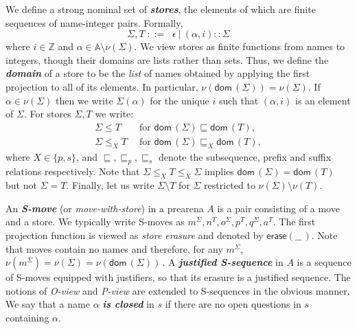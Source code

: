 \documentclass{CSML}
\theoremstyle{definition}\newtheorem{definition}[thm]{Definition}
\theoremstyle{definition}\newtheorem{example}[thm]{Example}
\theoremstyle{definition}\newtheorem{proposition}[thm]{Proposition}
\theoremstyle{definition}\newtheorem{lemma}[thm]{Lemma}
\theoremstyle{definition}\newtheorem{theorem}[thm]{Theorem}
\theoremstyle{definition}\newtheorem{corollary}[thm]{Corollary}
\theoremstyle{definition}\newtheorem{remark}[thm]{Remark}
\renewcommand\Sigma{\varSigma}
\newcommand\Tau{T}
\newcommand\Erase[1]{\mathsf{erase}(#1)}
\newcommand\remv{\setminus}
\newcommand\boldemph[1]{\emph{\textbf{#1}}}
\newcommand\A{\mathbb{A}}
\newcommand\Z{\mathbb{Z}}
\newcommand\dom[1]{\mathsf{dom}\,#1}
\newcommand\substore\leq
\newcommand\prefix{\sqsubseteq_p}
\newcommand\suffix{\sqsubseteq_s}
\newcommand\subseq\sqsubseteq
\newcommand\na\alpha
\begin{document}
We define a strong nominal set of \boldemph{stores}, the elements of which are finite sequences of
name-integer pairs. Formally,
\[ 
\Sigma,\Tau\; ::=\;\; \epsilon\ |\ (\na,i)::\Sigma 
\]
where $i\in\Z$ and $\na\in\A\setminus\nu(\Sigma)$. 
We view stores as finite functions from names to
integers, though their domains are lists rather than sets. Thus, we
define the \boldemph{domain} of a store to be the \emph{list} of
names obtained by applying the first projection to all of its elements. In particular, $\nu(\dom(\Sigma))=\nu(\Sigma)$. If $\na\in\nu(\Sigma)$ then we write $\Sigma(\na)$ for the unique $i$ such that $(\na,i)$ is an element of $\Sigma$. 
For stores $\Sigma,\Tau$ we write:
\begin{align*}
   \Sigma\substore\Tau\;\ &\text{for } \dom(\Sigma)\subseq\dom(\Tau),\\
   \Sigma\substore_X\Tau\;\ &\text{for } \dom(\Sigma)\subseq_X\dom(\Tau),
\end{align*}
where $X\in\{p,s\}$, and $\subseq,\prefix,\suffix$ denote the subsequence, prefix and suffix relations
respectively.
Note that $\Sigma\substore_X\Tau\substore_X\Sigma$ implies $\dom(\Sigma)=\dom(\Tau)$ but not $\Sigma=\Tau$.
Finally, let us write $\Sigma\remv\Tau$ for $\Sigma$ restricted to $\nu(\Sigma)\setminus\nu(\Tau)$.



An \boldemph{S-move} (or \emph{move-with-store}) in a prearena $A$ is a pair consisting of a move and a store. We typically write S-moves as $m^\Sigma,n^\Tau,o^\Sigma,p^\Tau,q^\Sigma,a^\Tau$.
The first projection function is viewed as \emph{store erasure} and denoted by $\Erase{\_\!\_\,}$.
Note that moves contain no names and therefore, for any $m^\Sigma$,\
$\nu(m^\Sigma)=\nu(\Sigma)=\nu(\dom(\Sigma))$\,.
A \boldemph{justified S-sequence} in $A$ is a sequence of S-moves equipped with justifiers, so that its erasure is a justified sequence. The notions of \emph{O-view} and \emph{P-view} are extended to S-sequences in the obvious manner.
We say that a name $\na$ \boldemph{is closed} in $s$
if there are no open questions in $s$ containing $\na$.
\end{document}
